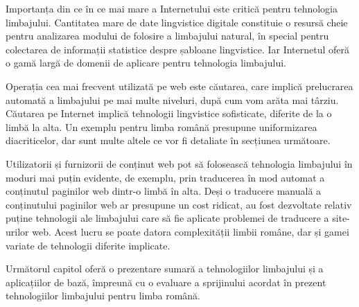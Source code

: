\begin{multicols}{2}
Importanța din ce în ce mai mare a Internetului este critică pentru tehnologia limbajului. Cantitatea mare de date lingvistice digitale constituie o resursă cheie pentru analizarea modului de folosire a limbajului natural, în special pentru colectarea de informații statistice despre șabloane lingvistice. Iar Internetul oferă o gamă largă de domenii de aplicare pentru tehnologia limbajului.

Operația cea mai frecvent utilizată pe web este căutarea, care implică prelucrarea automată a limbajului pe mai multe niveluri, după cum vom arăta mai târziu. Căutarea pe Internet implică tehnologii lingvistice sofisticate, diferite de la o limbă la alta. Un exemplu pentru limba română presupune uniformizarea diacriticelor, dar sunt multe altele ce vor fi detaliate în secțiunea următoare.

Utilizatorii și furnizorii de conținut web pot să folosească tehnologia limbajului în moduri mai puțin evidente, de exemplu, prin traducerea în mod automat a conținutul paginilor web \mbox{dintr-o} limbă în alta. Deși o traducere manuală a conținutului paginilor web ar presupune un cost ridicat, au fost dezvoltate relativ puține tehnologii ale limbajului care să fie aplicate problemei de traducere a site-urilor web. Acest lucru se poate datora complexității limbii române, dar și gamei variate de tehnologii diferite implicate.


Următorul capitol oferă o prezentare sumară a tehnologiilor limbajului și a aplicațiilor de bază, împreună cu o evaluare a sprijinului acordat în prezent tehnologiilor limbajului pentru limba română.

\end{multicols}

\clearpage

